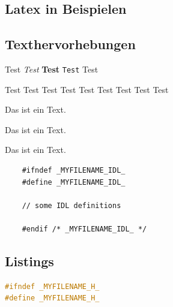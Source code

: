 \begin{appendix}

\chapter{Latex in Beispielen}

\section{Texthervorhebungen}

Test {\it Test} {\bf Test} {\tt Test} {\sc Test}

\tiny{Test} \small{Test} \normalsize{Test} \large{Test} \Large{Test}
\LARGE{Test} \huge{Test} \Huge{Test}
\normalsize{Test}

\begin{center}
Das ist ein Text. 
\end{center}

\begin{flushleft}
Das ist ein Text.
\end{flushleft}

\begin{flushright}
Das 
ist 
ein 
Text.

\end{flushright}

\begin{verbatim}
    #ifndef _MYFILENAME_IDL_
    #define _MYFILENAME_IDL_
    
    // some IDL definitions

    #endif /* _MYFILENAME_IDL_ */
\end{verbatim}

\newpage


\section{Listings}

\begin{lstlisting}[language=C, caption={Ein einfaches C Programm.}]
#ifndef _MYFILENAME_H_
#define _MYFILENAME_H_


\end{lstlisting}
\end{appendix}
